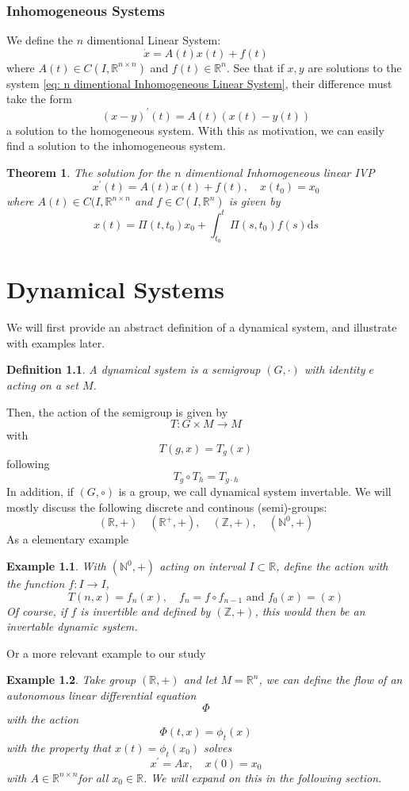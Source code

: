 \documentclass[a4paper, 12pt]{book}
\newtheorem{definition}{Definition}[chapter]
\newtheorem{theorem}{Theorem}[chapter]
\newtheorem{example}{Example}[chapter]
\begin{document}
\subsection{Inhomogeneous Systems}
We define the \( n \) dimentional Linear System:
\begin{equation}
	\dot{x}=A(t)x(t)+f(t)
	\label{eq: n dimentional Inhomogeneous Linear System}
\end{equation}
where \( A(t)\in C(I,\mathbb{R}^{n\times n} ) \) and \( f(t)\in \mathbb{R}^n \). See that if \( x,y \) are solutions to the system \eqref{eq: n dimentional Inhomogeneous Linear System}, their difference must take the form \[
	(x-y)^\prime(t)=A(t)(x(t)-y(t))
\]
a solution to the homogeneous system. With this as motivation, we can easily find a solution to the inhomogeneous system.
\begin{theorem}
	The solution for the \( n \) dimentional Inhomogeneous linear IVP \[
		x^\prime(t)=A(t)x(t)+f(t), \quad x(t_0)=x_0
	\]
	where \( A(t)\in C(I,\mathbb{R}^{n\times n}  \) and \( f\in C(I,\mathbb{R}^n) \) is given by
	\begin{equation}
		x(t)=\Pi(t,t_0)x_0+\int_{t_0}^{t} \Pi(s,t_0)f(s)\mathrm{d}s
		\label{eq:Solution for n dimentional Inhomogeneous Linear IVP}
	\end{equation}
	\label{thm: solution for the n dimentional Inhomogeneous IVP}
\end{theorem}
\chapter{Dynamical Systems}
We will first provide an abstract definition of a dynamical system, and illustrate with examples later.
\begin{definition}
	A dynamical system is a semigroup \( (G,\cdot) \) with identity \( e \) acting on a set \( M \).
\end{definition}
Then, the action of the semigroup is given by \[
	T:G\times M\to M
\]
with \[
	T(g,x)=T_g(x)
\]
following \[
	T_g\circ T_h=T_{g\cdot h}
\]
In addition, if \( (G,\circ) \) is a group, we call dynamical system invertable. We will mostly discuss the following discrete and continous (semi)-groups:
\[
	(\mathbb{R}, +) \quad (\mathbb{R}^+, +), \quad (\mathbb{Z}, +), \quad (\mathbb{N}^0, +)
\]
As a elementary example
\begin{example}
	With \( (\mathbb{N}^0, +) \) acting on interval \( I\subset \mathbb{R} \), define the action with the function $f:I\to I$, \[
		T(n,x)=f_n(x), \quad f_n=f\circ f_{n-1} \text{ and } f_0(x)=(x)
	\]
	Of course, if \( f \) is invertible and defined by \( (\mathbb{Z},+) \), this would then be an invertable dynamic system.
\end{example}
Or a more relevant example to our study
\begin{example}
	Take group \( (\mathbb{R}, +) \) and let \( M= \mathbb{R}^n \), we can define the flow of an autonomous linear differential equation \[
		\Phi
	\]
	with the action
	\[
		\Phi(t,x) = \phi_t(x)
	\]
	with the property that \( x(t)=\phi_t(x_0) \) solves
	\[
		x^\prime=Ax, \quad x(0)=x_0
	\] with \( A\in \mathbb{R}^{n\times n}   \)for all \( x_0\in \mathbb{R} \). We will expand on this in the following section.
\end{example}
\end{document}
